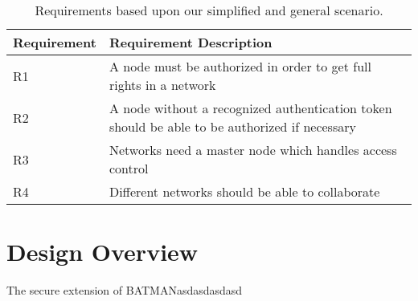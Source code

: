 \begin{table}[ht!]
	\centering
	\begin{tabular}{ | l | p{11cm} | }
	\hline
	\textbf{Requirement} & \textbf{Requirement Description}\\\hline
		R1 & A node must be authorized in order to get full rights in a
		network\\\hline
		R2 & A node without a recognized authentication token should be able to be
		authorized if necessary\\ \hline
		R3 & Networks need a master node which handles access control\\\hline
		R4 & Different networks should be able to collaborate\\\hline
	\end{tabular}
	\caption{Requirements based upon our simplified and general scenario.}
	\label{tab:our_req}
\end{table}



\section{Design Overview}
The secure extension of BATMANasdasdasdasd